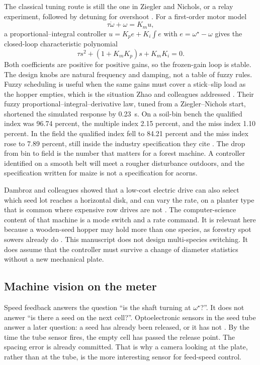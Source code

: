 The classical tuning route is still the one in Ziegler and Nichols, or a relay experiment, followed by detuning for overshoot \cite{ziegler1942,astrom2006,ogata2010}. For a first-order motor model
\begin{equation}
\tau\dot\omega + \omega = K_m u,
\label{eq:motor1}
\end{equation}
a proportional--integral controller $u = K_p e + K_i\int e$ with $e=\omega^{\star}-\omega$ gives the closed-loop characteristic polynomial
\begin{equation}
\tau s^2 + (1+K_m K_p)s + K_m K_i = 0.
\label{eq:pi-char}
\end{equation}
Both coefficients are positive for positive gains, so the frozen-gain loop is stable. The design knobs are natural frequency and damping, not a table of fuzzy rules. Fuzzy scheduling is useful when the same gains must cover a stick--slip load as the hopper empties, which is the situation Zhao and colleagues addressed \cite{zhao2024}. Their fuzzy proportional--integral--derivative law, tuned from a Ziegler--Nichols start, shortened the simulated response by 0.23~s. On a soil-bin bench the qualified index was 96.74 percent, the multiple index 2.15 percent, and the miss index 1.10 percent. In the field the qualified index fell to 84.21 percent and the miss index rose to 7.89 percent, still inside the industry specification they cite \cite{jb10293}. The drop from bin to field is the number that matters for a forest machine. A controller identified on a smooth belt will meet a rougher disturbance outdoors, and the specification written for maize is not a specification for acorns.

Dambroz and colleagues showed that a low-cost electric drive can also select which seed lot reaches a horizontal disk, and can vary the rate, on a planter type that is common where expensive row drives are not \cite{dambroz2025}. The computer-science content of that machine is a mode switch and a rate command. It is relevant here because a wooden-seed hopper may hold more than one species, as forestry spot sowers already do \cite{newforest}. This manuscript does not design multi-species switching. It does assume that the controller must survive a change of diameter statistics without a new mechanical plate.

\subsection{Machine vision on the meter}

Speed feedback answers the question ``is the shaft turning at $\omega^{\star}$?''. It does not answer ``is there a seed on the next cell?''. Optoelectronic sensors in the seed tube answer a later question: a seed has already been released, or it has not \cite{kocher1998,lan1999,onal2009}. By the time the tube sensor fires, the empty cell has passed the release point. The spacing error is already committed. That is why a camera looking at the plate, rather than at the tube, is the more interesting sensor for feed-speed control.

